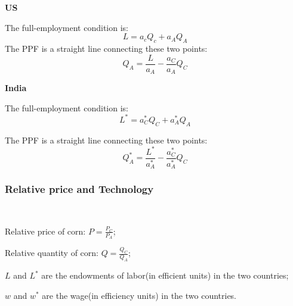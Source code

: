 \begin{minipage}{0.45\textwidth}
    \textbf{US}
    
    The full-employment condition is:
    \[
    L = a_{c}Q_{c} + a_{A}Q_{A}
    \]
    The PPF is a straight line connecting these two points:
    \[
    Q_A = \frac{L}{a_A} - \frac{a_C}{a_A}Q_C
    \]
    \centering
\end{minipage}
\hfill
\begin{minipage}{0.45\textwidth}
    \textbf{India}
    
    The full-employment condition is:
    \[
    L^* = a_{C}^*Q_{C} + a_{A}^*Q_{A}
    \]

    The PPF is a straight line connecting these two points:
    \[
    Q_A^* = \frac{L^*}{a_A^*} - \frac{a_C^*}{a_A^*}Q_C
    \]
    \centering
\end{minipage}

\subsubsection{Relative price and Technology}

\begin{notation}
    \

    Relative price of corn: $P = \frac{P_C}{P_A}$;

    Relative quantity of corn: $Q = \frac{Q_C}{Q_A}$;

    $L$ and $L^*$ are the endowments of labor(in efficient units) in the two countries;

    $w$ and $w^*$ are the wage(in efficiency units) in the two countries.
\end{notation}

